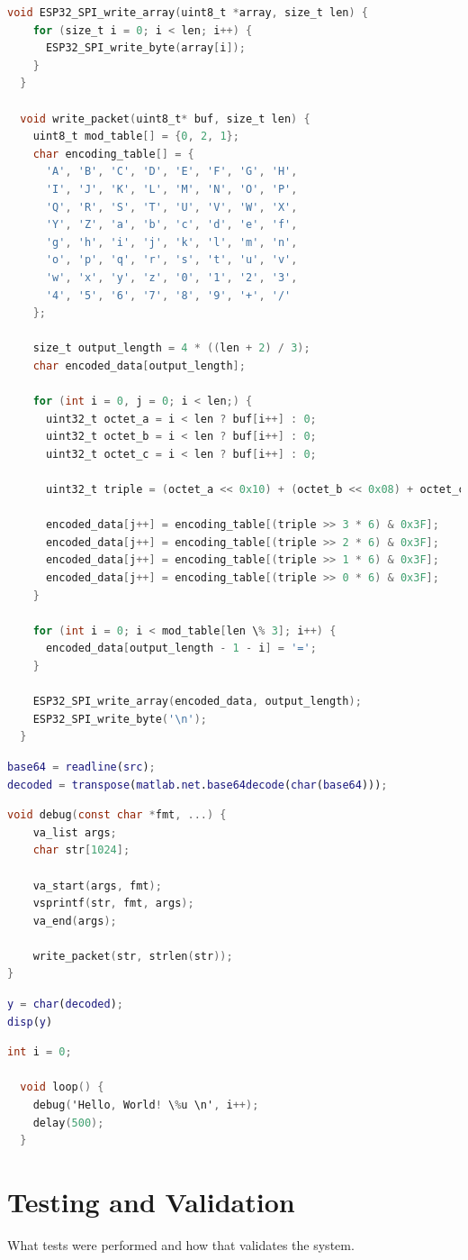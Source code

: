 \begin{lstlisting}[language=C]
  void ESP32_SPI_write_array(uint8_t *array, size_t len) {
    for (size_t i = 0; i < len; i++) {
      ESP32_SPI_write_byte(array[i]);
    }
  }

  void write_packet(uint8_t* buf, size_t len) {
    uint8_t mod_table[] = {0, 2, 1};
    char encoding_table[] = {
      'A', 'B', 'C', 'D', 'E', 'F', 'G', 'H',
      'I', 'J', 'K', 'L', 'M', 'N', 'O', 'P',
      'Q', 'R', 'S', 'T', 'U', 'V', 'W', 'X',
      'Y', 'Z', 'a', 'b', 'c', 'd', 'e', 'f',
      'g', 'h', 'i', 'j', 'k', 'l', 'm', 'n',
      'o', 'p', 'q', 'r', 's', 't', 'u', 'v',
      'w', 'x', 'y', 'z', '0', '1', '2', '3',
      '4', '5', '6', '7', '8', '9', '+', '/'
    };

    size_t output_length = 4 * ((len + 2) / 3);
    char encoded_data[output_length];

    for (int i = 0, j = 0; i < len;) {
      uint32_t octet_a = i < len ? buf[i++] : 0;
      uint32_t octet_b = i < len ? buf[i++] : 0;
      uint32_t octet_c = i < len ? buf[i++] : 0;

      uint32_t triple = (octet_a << 0x10) + (octet_b << 0x08) + octet_c;

      encoded_data[j++] = encoding_table[(triple >> 3 * 6) & 0x3F];
      encoded_data[j++] = encoding_table[(triple >> 2 * 6) & 0x3F];
      encoded_data[j++] = encoding_table[(triple >> 1 * 6) & 0x3F];
      encoded_data[j++] = encoding_table[(triple >> 0 * 6) & 0x3F];
    }

    for (int i = 0; i < mod_table[len \% 3]; i++) {
      encoded_data[output_length - 1 - i] = '=';
    }

    ESP32_SPI_write_array(encoded_data, output_length);
    ESP32_SPI_write_byte('\n');
  }
\end{lstlisting}

\begin{lstlisting}[language=MATLAB]
base64 = readline(src);
decoded = transpose(matlab.net.base64decode(char(base64)));
\end{lstlisting}


\begin{lstlisting}[language=C]
void debug(const char *fmt, ...) {
    va_list args;
    char str[1024];

    va_start(args, fmt);
    vsprintf(str, fmt, args);
    va_end(args);

    write_packet(str, strlen(str));
}
\end{lstlisting}

\begin{lstlisting}[language=MATLAB]
y = char(decoded);
disp(y)
\end{lstlisting}

\begin{lstlisting}[language=C]
  int i = 0;

  void loop() {
    debug('Hello, World! \%u \n', i++);
    delay(500);
  }
\end{lstlisting}

\section{Testing and Validation}
What tests were performed and how that validates the system.
